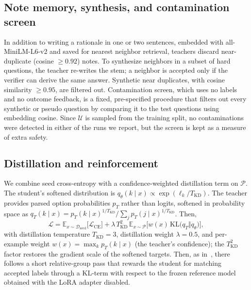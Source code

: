 \documentclass[conference]{IEEEtran}
\begin{document}
\subsection{Note memory, synthesis, and contamination screen}
In addition to writing a rationale in one or two sentences, embedded with all-MiniLM-L6-v2 and saved for nearest neighbor retrieval, teachers discard near-duplicate (cosine $\ge 0.92$) notes. To synthesize neighbors in a subset of hard questions, the teacher re-writes the stem; a neighbor is accepted only if the verifier can derive the same answer. Synthetic near duplicates, with cosine similarity $\ge 0.95$, are filtered out. Contamination screen, which uses no labels and no outcome feedback, is a fixed, pre-specified procedure that filters out every synthetic or pseudo question by comparing it to the test questions using embedding cosine. Since $\mathcal{U}$ is sampled from the training split, no contaminations were detected in either of the runs we report, but the screen is kept as a measure of extra safety.

\subsection{Distillation and reinforcement}
We combine seed cross-entropy with a confidence-weighted distillation term on $\mathcal{P}$. The student's softened distribution is $q_\theta(k\mid x)\propto\exp(\ell_k/T_{\text{KD}})$. The teacher provides parsed option probabilities $p_T$ rather than logits, softened in probability space as $q_T(k\mid x)=p_T(k\mid x)^{1/T_{\text{KD}}}\big/\sum_j p_T(j\mid x)^{1/T_{\text{KD}}}$. Then,
\begin{equation}
\mathcal{L}=\mathbb{E}_{x\sim\mathcal{D}_{\text{seed}}}\!\big[\mathcal{L}_{\text{CE}}\big]
+\lambda\,T_{\text{KD}}^{2}\,\mathbb{E}_{x\sim\mathcal{P}}\!\big[w(x)\,\mathrm{KL}\!\big(q_T\Vert q_\theta\big)\big],
\end{equation}
with distillation temperature $T_{\text{KD}}=3$, distillation weight $\lambda=0.5$, and per-example weight $w(x)=\max_k p_T(k\mid x)$ (the teacher's confidence); the $T_{\text{KD}}^{2}$ factor restores the gradient scale of the softened targets. Then, as in~\cite{grpo}, there follows a short relative-group pass that rewards the student for matching accepted labels through a KL-term with respect to the frozen reference model obtained with the LoRA adapter disabled.
\end{document}
